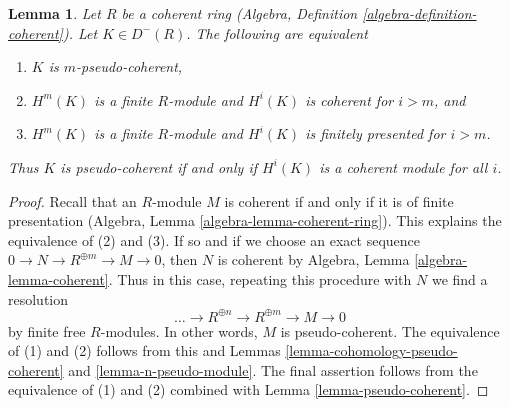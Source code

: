 \documentclass[10pt,a4paper]{amsart}
\theoremstyle{plain}
\newtheorem{lemma}[subsection]{Lemma}
\theoremstyle{definition}
\theoremstyle{remark}
\numberwithin{equation}{subsection}
\begin{document}
\begin{lemma}
\label{lemma-coherent-pseudo-coherent}
Let $R$ be a coherent ring
(Algebra, Definition \ref{algebra-definition-coherent}).
Let $K \in D^-(R)$. The following are equivalent
\begin{enumerate}
\item $K$ is $m$-pseudo-coherent,
\item $H^m(K)$ is a finite $R$-module and $H^i(K)$ is coherent for $i > m$, and
\item $H^m(K)$ is a finite $R$-module and
$H^i(K)$ is finitely presented for $i > m$.
\end{enumerate}
Thus $K$ is pseudo-coherent if and only if $H^i(K)$
is a coherent module for all $i$.
\end{lemma}

\begin{proof}
Recall that an $R$-module $M$ is coherent if and only if it is of finite
presentation (Algebra, Lemma \ref{algebra-lemma-coherent-ring}).
This explains the equivalence of (2) and (3). If so and if we choose an exact
sequence $0 \to N \to R^{\oplus m} \to M \to 0$, then $N$ is coherent by
Algebra, Lemma \ref{algebra-lemma-coherent}. Thus in this case, repeating
this procedure with $N$ we find a resolution
$$
\ldots \to R^{\oplus n} \to R^{\oplus m} \to M \to 0
$$
by finite free $R$-modules. In other words, $M$ is pseudo-coherent.
The equivalence of (1) and (2) follows from this and
Lemmas \ref{lemma-cohomology-pseudo-coherent} and
\ref{lemma-n-pseudo-module}.
The final assertion follows from the equivalence of (1) and (2)
combined with Lemma \ref{lemma-pseudo-coherent}.
\end{proof}
\end{document}
